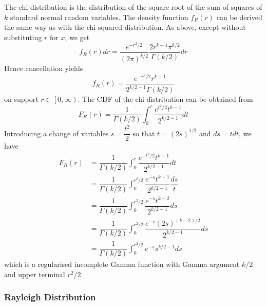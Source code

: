 \documentclass[11pt]{report} %
\begin{document}
The chi-distribution is the distribution of the square root of the sum of squares of $k$ standard normal random variables. The density function $f_{R}\left(r\right)$ can be derived the same way as with the chi-squared distribution. As above, except without substituting $r$ for $x$, we get
\begin{equation}
f_{R}\left(r\right)dr = \dfrac{e^{-r^{2}/2}}{\left(2\pi\right)^{k/2}}\dfrac{2r^{k-1}\pi^{k/2}}{\Gamma\left(k/2\right)}dr
\end{equation}
Hence cancellation yields
\begin{equation}
f_{R}\left(r\right) = \dfrac{e^{-r^{2}/2}r^{k - 1}}{2^{k/2 - 1}\Gamma\left(k/2\right)}
\end{equation}
on support $r \in \left[0, \infty\right)$. The CDF of the chi-distribution can be obtained from
\begin{equation}
F_{R}\left(r\right) = \dfrac{1}{\Gamma\left(k/2\right)}\int_{0}^{r}\dfrac{e^{t^{2}/2}t^{k - 1}}{2^{k/2 - 1}}dt
\end{equation}
Introducing a change of variables $s = \dfrac{t^{2}}{2}$ so that $t = \left(2s\right)^{1/2}$ and $ds = t dt$, we have
\begin{align}
F_{R}\left(r\right) &= \dfrac{1}{\Gamma\left(k/2\right)}\int_{0}^{r}\dfrac{e^{-t^{2}/2}t^{k-1}}{2^{k/2-1}}dt \\
&= \dfrac{1}{\Gamma\left(k/2\right)}\int_{0}^{r^{2}/2}\dfrac{e^{-s}t^{k-1}}{2^{k/2-1}}\dfrac{ds}{t} \\
&= \dfrac{1}{\Gamma\left(k/2\right)}\int_{0}^{r^{2}/2}\dfrac{e^{-s}t^{k-2}}{2^{k/2-1}}ds \\
&= \dfrac{1}{\Gamma\left(k/2\right)}\int_{0}^{r^{2}/2}\dfrac{e^{-s}\left(2s\right)^{\left(k-2\right)/2}}{2^{k/2-1}}ds \\
&= \dfrac{1}{\Gamma\left(k/2\right)}\int_{0}^{r^{2}/2}e^{-s}s^{k/2-1}ds
\end{align}
which is a regularised incomplete Gamma function with Gamma argument $k/2$ and upper terminal $r^{2}/2$.

\subsubsection{Rayleigh Distribution}
\end{document}
